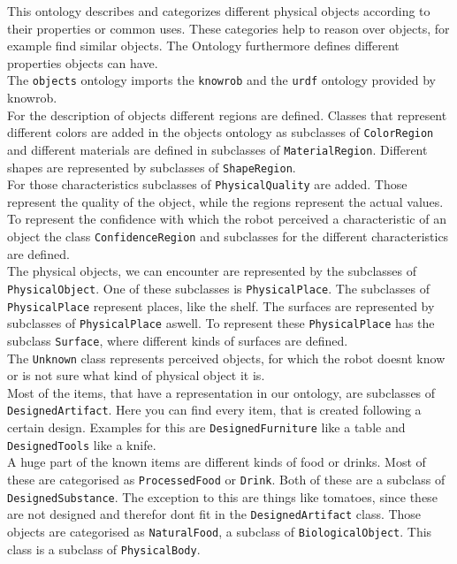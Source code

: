 \documentclass[main.tex]{subfiles}
\begin{document}
This ontology describes and categorizes different physical objects according to their properties or common uses. These categories help to reason over objects, for example find similar objects. The Ontology furthermore defines different properties objects can have. \\
The \texttt{objects} ontology imports the \texttt{knowrob} and the \texttt{urdf} ontology provided by knowrob.\\
For the description of objects different regions are defined. Classes that represent different colors are added in the objects ontology as subclasses of \texttt{ColorRegion} and different materials are defined in subclasses of \texttt{MaterialRegion}. Different shapes are represented by subclasses of \texttt{ShapeRegion}.\\
For those characteristics subclasses of \texttt{PhysicalQuality} are added. Those represent the quality of the object, while the regions represent the actual values.\\
To represent the confidence with which the robot perceived a characteristic of an object the class \texttt{ConfidenceRegion} and subclasses for the different characteristics are defined.\\
The physical objects, we can encounter are represented by the subclasses of \texttt{PhysicalObject}.
One of these subclasses is \texttt{PhysicalPlace}. The subclasses of \texttt{PhysicalPlace} represent places, like the shelf. The surfaces are represented by subclasses of \texttt{PhysicalPlace} aswell. To represent these \texttt{PhysicalPlace} has the subclass \texttt{Surface}, where different kinds of surfaces are defined.\\
The \texttt{Unknown} class represents perceived objects, for which the robot doesnt know or is not sure what kind of physical object it is.\\
Most of the items, that have a representation in our ontology, are subclasses of \texttt{DesignedArtifact}.
Here you can find every item, that is created following a certain design. 
Examples for this are \texttt{DesignedFurniture} like a table and \texttt{DesignedTools} like a knife.\\
A huge part of the known items are different kinds of food or drinks. Most of these are categorised as \texttt{ProcessedFood} or \texttt{Drink}. Both of these are a subclass of \texttt{DesignedSubstance}. The exception to this are things like tomatoes, since these are not designed and therefor dont fit in the \texttt{DesignedArtifact} class. Those objects are categorised as \texttt{NaturalFood}, a subclass of \texttt{BiologicalObject}. This class is a subclass of \texttt{PhysicalBody}.\\
\end{document}
